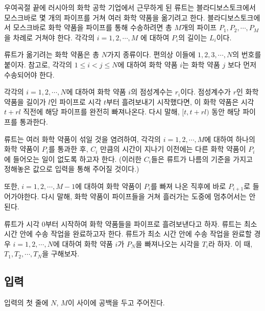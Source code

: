 \documentclass{article}
\begin{document}
우여곡절 끝에 러시아의 화학 공학 기업에서 근무하게 된 류트는 블라디보스토크에서 모스크바로 몇 개의 파이프를 거쳐 여러 화학 약품을 옮기려고 한다. 블라디보스토크에서 모스크바로 화학 약품을 파이프를 통해 수송하려면 총 $M$개의 파이프 $P_1, P_2, \cdots, P_M$을 차례로 거쳐야 한다. 각각의 $i = 1, 2, \cdots, M$ 에 대하여 $P_i$의 길이는 $L_i$이다.\newline

	
	

류트가 옮기려는 화학 약품은 총 $N$가지 종류이다. 편의상 이들에 $1, 2, 3, \cdots, N$의 번호를 붙이자. 참고로, 각각의 $1 \le i < j \le N$에 대하여 화학 약품 $i$는 화학 약품 $j$ 보다 먼저 수송되어야 한다.\newline

각각의 $i = 1, 2, \cdots, N$에 대하여 화학 약품 $i$의 점성계수는 $r_i$이다. 점성계수가 $r$인 화학 약품을 길이가 $l$인 파이프로 시각 $t$부터 흘려보내기 시작했다면, 이 화학 약품은 시각 $t+rl$ 직전에 해당 파이프를 완전히 빠져나온다. 다시 말해, $[t, t+rl)$ 동안 해당 파이프를 통과한다.\newline

류트는 여러 화학 약품이 섞일 것을 염려하여, 각각의 $i = 1, 2, \cdots, M$에 대하여 하나의 화학 약품이 $P_i$를 통과한 후, $C_i$ 만큼의 시간이 지나기 이전에는 다른 화학 약품이 $P_i$에 들어오는 일이 없도록 하고자 한다. (이러한 $C_i$들은 류트가 나름의 기준을 가지고 정해놓은 값으로 입력을 통해 주어질 것이다.)\newline

또한, $i = 1, 2, \cdots, M-1$에 대하여 화학 약품이 $P_i$를 빠져 나온 직후에 바로 $P_{i+1}$로 들어가야한다. 다시 말해, 화학 약품이 파이프들을 거쳐 흘러가는 도중에 멈추어서는 안된다.\newline

류트가 시각 $0$부터 시작하여 화학 약품들을 파이프로 흘려보낸다고 하자. 류트는 최소 시간 안에 수송 작업을 완료하고자 한다. 류트가 최소 시간 안에 수송 작업을 완료할 경우 $i = 1, 2, \cdots, N$에 대하여 화학 약품 $i$가 $P_N$을 빠져나오는 시각을 $T_i$라 하자. 이 때, $T_1, T_2, \cdots, T_N$을 구해보자.\newline

\subsection{입력}
입력의 첫 줄에 $N$, $M$이 사이에 공백을 두고 주어진다.
\end{document}
